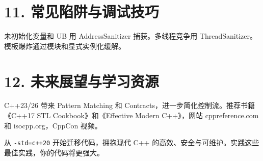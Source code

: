 \chapter{11. 常见陷阱与调试技巧}
未初始化变量和 UB 用 AddressSanitizer 捕获。多线程竞争用 ThreadSanitizer。模板爆炸通过模块和显式实例化缓解。\par
\chapter{12. 未来展望与学习资源}
C++23/26 带来 Pattern Matching 和 Contracts，进一步简化控制流。推荐书籍《C++17 STL Cookbook》和《Effective Modern C++》，网站 cppreference.com 和 isocpp.org，CppCon 视频。\par
从 \texttt{-std=c++20} 开始迁移代码，拥抱现代 C++ 的高效、安全与可维护。实践这些最佳实践，你的代码将更强大。\par
